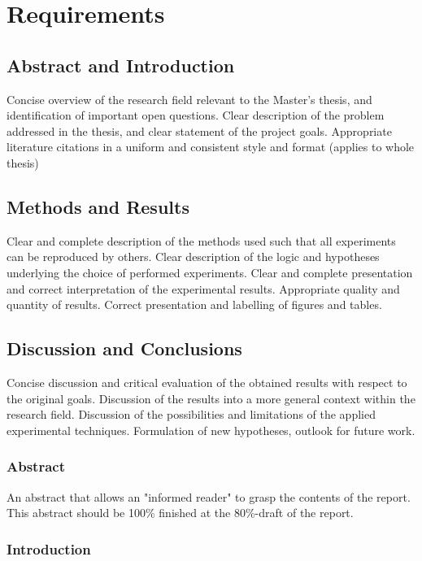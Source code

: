 \section*{Requirements}
\subsection*{Abstract and Introduction} 
Concise overview of the research field relevant to the Master’s thesis, and identification of important open questions. Clear description of the problem addressed in the thesis, and clear statement of the project goals. Appropriate literature citations in a uniform and consistent style and format (applies to whole thesis)

\subsection*{Methods and Results}

Clear and complete description of the methods used such that all experiments can be reproduced by others. Clear description of the logic and hypotheses underlying the choice of performed experiments. Clear and complete presentation and correct interpretation of the experimental results. Appropriate quality and quantity of results. Correct presentation and labelling of figures and tables.

\subsection*{Discussion and Conclusions} 

Concise discussion and critical evaluation of the obtained results with respect to the original goals. Discussion of the results into a more general context within the research field. Discussion of the possibilities and limitations of the applied experimental techniques. Formulation of new hypotheses, outlook for future work.

\subsubsection{Abstract}

An abstract that allows an "informed reader" to grasp the contents of the report. This abstract should be 100\% finished at the 80\%-draft of the report.

\subsubsection{Introduction}

